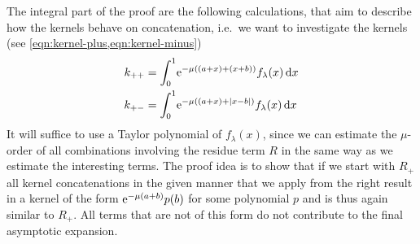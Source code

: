 The integral part of the proof are the following calculations, that aim to
describe how the kernels behave on concatenation, i.e.\ we want to investigate
the kernels (see \cref{eqn:kernel-plus,eqn:kernel-minus})
\begin{align*}
  k_{++} &= \Int{x}{\Eto{-\mu((a + x) + (x + b))}f_\lambda(x)} \\
  k_{+-} &= \Int{x}{\Eto{-\mu((a + x) + \Abs{x - b})}f_\lambda(x)}
\end{align*}
It will suffice to use a Taylor polynomial of $f_\lambda(x)$, since we can
estimate the $\mu$-order of all combinations involving the residue term $R$ in
the same way as we estimate the interesting terms. The proof idea is to show
that if we start with $R_+$ all kernel concatenations in the given manner that
we apply from the right result in a kernel of the form $\Eto{-\mu(a+b)}p(b)$ for
some polynomial $p$ and is thus again similar to $R_+$. All terms that are not
of this form do not contribute to the final asymptotic expansion.
